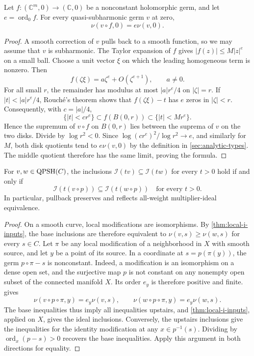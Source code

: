\begin{lemma}\label{curve-map:lelong-pullback}
Let $f\colon(\mathbb C^m,0)\to(\mathbb C,0)$ be a nonconstant
holomorphic germ, and let $e=\operatorname{ord}_0f$.
For every quasi-subharmonic germ $v$ at zero,
\[
 \nu(v\circ f,0)=e\nu(v,0).
\]
\end{lemma}
\begin{proof}
A smooth correction of $v$ pulls back to a smooth function, so
we may assume that $v$ is subharmonic. The Taylor expansion of
$f$ gives $|f(z)|\leq M|z|^e$ on a small ball. Choose a unit vector
$\xi$ on which the leading homogeneous term is nonzero. Then
\[
 f(\zeta\xi)=a\zeta^e+O(\zeta^{e+1}),\qquad a\ne0.
\]
For all small $r$, the remainder has modulus at most
$|a|r^e/4$ on $|\zeta|=r$. If $|t|<|a|r^e/4$, Rouch\'e's theorem
shows that $f(\zeta\xi)-t$ has $e$ zeros in $|\zeta|<r$.
Consequently, with $c=|a|/4$,
\[
 \{|t|<cr^e\}\subset f(B(0,r))
                  \subset\{|t|<Mr^e\}.
\]
Hence the supremum of $v\circ f$ on $B(0,r)$ lies between the
suprema of $v$ on the two disks. Divide by $\log r^2<0$. Since
$\log(cr^e)^2/\log r^2\to e$, and similarly for $M$, both disk
quotients tend to $e\nu(v,0)$ by the definition in
\cref{sec:analytic-types}. The middle quotient therefore has
the same limit, proving the formula.
\end{proof}

\begin{corollary}\label{curve-map:ideal-types}
For $v,w\in\mathrm{QPSH}(C)$, the inclusions
$\mathcal I(tv)\subseteq\mathcal I(tw)$ for every $t>0$ hold
if and only if
\[
 \mathcal I(t(v\circ p))\subseteq\mathcal I(t(w\circ p))
 \quad\text{for every }t>0.
\]
In particular, pullback preserves and reflects all-weight
multiplier-ideal equivalence.
\end{corollary}
\begin{proof}
On a smooth curve, local modifications are isomorphisms.
By \cref{thm:local-i-inputs}, the base inclusions are therefore
equivalent to $\nu(v,s)\geq\nu(w,s)$ for every $s\in C$.
Let $\pi$ be any local modification of a neighborhood in $X$
with smooth source, and let $y$ be a point of its source.
In a coordinate at $s=p(\pi(y))$, the germ $p\circ\pi-s$ is
nonconstant. Indeed, a modification is an isomorphism on a
dense open set, and the surjective map $p$ is not constant on
any nonempty open subset of the connected manifold $X$. Its
order $e_y$ is therefore positive and finite.
 gives
\[
 \nu(v\circ p\circ\pi,y)=e_y\nu(v,s),\qquad
 \nu(w\circ p\circ\pi,y)=e_y\nu(w,s).
\]
The base inequalities thus imply all inequalities upstairs,
and \cref{thm:local-i-inputs}, applied on $X$, gives the ideal
inclusions. Conversely, the upstairs inclusions give the inequalities for
the identity modification at any $x\in p^{-1}(s)$. Dividing by
$\operatorname{ord}_x(p-s)>0$ recovers the base inequalities.
Apply this argument in both directions for equality.
\end{proof}

